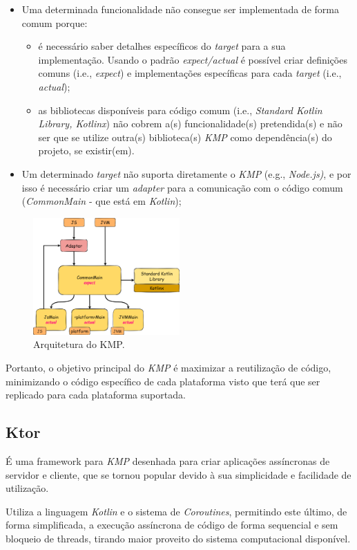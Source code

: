 \begin{itemize}[topsep=0pt,itemsep=0pt,partopsep=0pt, parsep=0pt]
    \item Uma determinada funcionalidade não consegue ser implementada de forma comum porque:
    \begin{itemize}[topsep=0pt,itemsep=0pt,partopsep=0pt, parsep=0pt]
        \item é necessário saber detalhes específicos do \textit{target} para a sua implementação.
        Usando o padrão \textit{expect/actual} é possível criar definições comuns (i.e., \textit{expect}) e implementações específicas para cada \textit{target} (i.e., \textit{actual});
        \item as bibliotecas disponíveis para código comum (i.e., \textit{Standard Kotlin Library, Kotlinx}) não cobrem a(s) funcionalidade(s) pretendida(s) e não ser que se utilize outra(s) biblioteca(s) \textit{KMP} como dependência(s) do projeto, se existir(em).
    \end{itemize}
    \item Um determinado \textit{target} não suporta diretamente o \textit{KMP} (e.g., \textit{Node.js)}, e por isso é necessário criar um \textit{adapter} para a comunicação com o código comum (\textit{CommonMain} - que está em \textit{Kotlin});
\end{itemize}

\begin{figure}[H]
    \centering
    \includegraphics[width=0.5\textwidth]{../docs/imgs/kmp-architecture}
    \caption{Arquitetura do KMP.}
    \label{fig:kmp-architecture}
\end{figure}

Portanto, o objetivo principal do \textit{KMP} é maximizar a reutilização de código, minimizando o código específico de cada plataforma visto que terá que ser replicado para cada plataforma suportada.

\subsection{Ktor}\label{subsec:ktor}

É uma framework para \textit{KMP} desenhada para criar aplicações assíncronas de
servidor e cliente, que se tornou popular devido à sua simplicidade e facilidade de utilização.

Utiliza a linguagem \textit{Kotlin} e o sistema de \textit{Coroutines}, permitindo este último, de forma simplificada, a execução
assíncrona de código de forma sequencial e sem bloqueio de threads, tirando maior proveito do sistema computacional disponível.